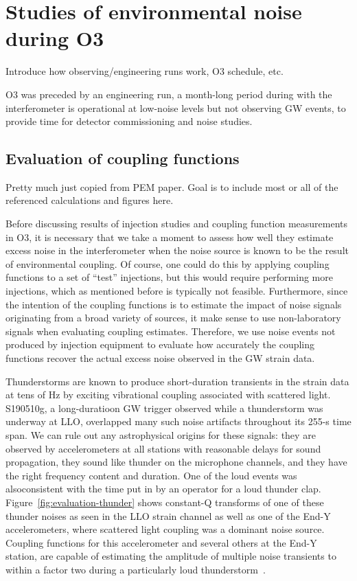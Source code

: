 \chapter{Studies of environmental noise during O3}\label{ch:noise-studies}

{\color{red}
Introduce how observing/engineering runs work, O3 schedule, etc.}

\ac{O3} was preceded by an engineering run, a month-long period during with the interferometer is operational at low-noise levels but not observing \ac{GW} events, to provide time for detector commissioning and noise studies.

\section{Evaluation of coupling functions}\label{sec:evaluation-of-cf}

{\color{red}
Pretty much just copied from PEM paper.
Goal is to include most or all of the referenced calculations and figures here.}

Before discussing results of injection studies and coupling function measurements in \ac{O3}, it is necessary that we take a moment to assess how well they estimate excess noise in the interferometer when the noise source is known to be the result of environmental coupling.
Of course, one could do this by applying coupling functions to a set of ``test'' injections, but this would require performing more injections, which as mentioned before is typically not feasible.
Furthermore, since the intention of the coupling functions is to estimate the impact of noise signals originating from a broad variety of sources, it make sense to use non-laboratory signals when evaluating coupling estimates.
Therefore, we use noise events not produced by injection equipment to evaluate how accurately the coupling functions recover the actual excess noise observed in the \ac{GW} strain data.

Thunderstorms are known to produce short-duration transients in the strain data at tens of Hz by exciting vibrational coupling associated with scattered light.
S190510g, a long-duratioon GW trigger observed while a thunderstorm was underway at LLO, overlapped many such noise artifacts throughout its 255-s time span.
We can rule out any astrophysical origins for these signals: they are observed by accelerometers at all stations with reasonable delays for sound propagation, they sound like thunder on the microphone channels, and they have the right frequency content and duration. One of the loud events was alsoconsistent with the time put in by an operator for a loud thunder clap.
Figure~\ref{fig:evaluation-thunder} shows constant-Q transforms of one of these thunder noises as seen in the LLO strain channel as well as one of the End-Y accelerometers, where scattered light coupling was a dominant noise source.
Coupling functions for this accelerometer and several others at the End-Y station, are capable of estimating the amplitude of multiple noise transients to within a factor two during a particularly loud thunderstorm~\citep{alog_thunder}.

